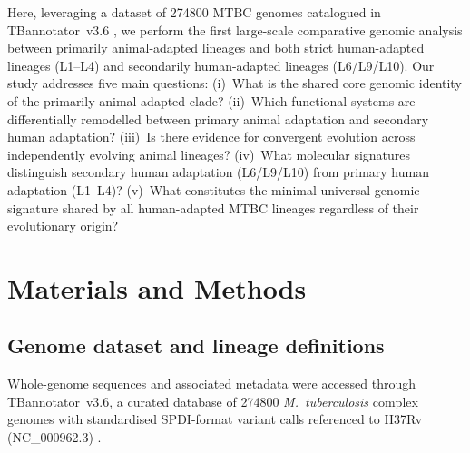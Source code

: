 \documentclass[11pt,a4paper]{article}
\begin{document}
Here, leveraging a dataset of \num{274800} MTBC genomes catalogued in
TBannotator~v3.6 \cite{Guyeux2024}, we perform the first large-scale comparative
genomic analysis between primarily animal-adapted lineages and both strict
human-adapted lineages (L1--L4) and secondarily human-adapted lineages (L6/L9/L10).
%
Our study addresses five main questions:
(i)~What is the shared core genomic identity of the primarily animal-adapted clade?
(ii)~Which functional systems are differentially remodelled between primary
animal adaptation and secondary human adaptation?
(iii)~Is there evidence for convergent evolution across independently evolving
animal lineages?
(iv)~What molecular signatures distinguish secondary human adaptation (L6/L9/L10)
from primary human adaptation (L1--L4)?
(v)~What constitutes the minimal universal genomic signature shared by all
human-adapted MTBC lineages regardless of their evolutionary origin?

\section{Materials and Methods}
\label{sec:methods}

\subsection{Genome dataset and lineage definitions}
\label{sec:methods:data}

Whole-genome sequences and associated metadata were accessed through TBannotator~v3.6,
a curated database of \num{274800} \textit{M.~tuberculosis} complex genomes with
standardised SPDI-format variant calls referenced to H37Rv (NC\_000962.3)
\cite{Guyeux2024}.
\end{document}
